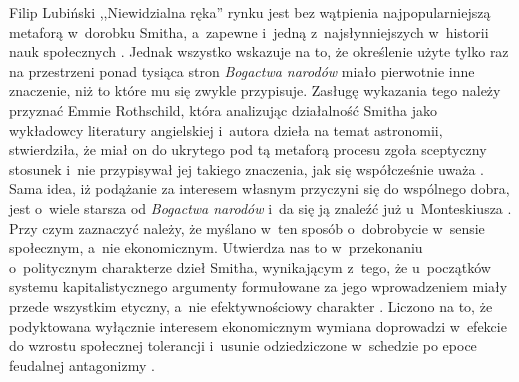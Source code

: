 \begin{artplenv}{Filip Lubiński}
,,Niewidzialna ręka'' rynku jest bez wątpienia najpopularniejszą metaforą w~dorobku
Smitha, a~zapewne i~jedną z~najsłynniejszych w~historii nauk społecznych
\parencite[s.~104]{cremaschi_metaphors_2002}.
Jednak wszystko
wskazuje na to, że określenie użyte tylko raz na przestrzeni ponad tysiąca stron \textit{Bogactwa narodów} miało
pierwotnie inne znaczenie, niż to które mu się zwykle przypisuje. Zasługę wykazania tego należy przyznać Emmie
Rothschild, która analizując działalność Smitha jako wykładowcy literatury angielskiej i~autora dzieła na temat
astronomii, stwierdziła, że miał on do ukrytego pod tą metaforą procesu zgoła sceptyczny stosunek i~nie przypisywał jej
takiego znaczenia, jak się współcześnie uważa
\parencite[s.~116–153]{rothschild_economic_2002}.
Sama idea, iż
podążanie za interesem własnym przyczyni się do wspólnego dobra, jest o~wiele starsza od \textit{Bogactwa narodów} i~da
się ją znaleźć już u~Monteskiusza
\parencite[s.~50]{montesquieu_o_2009}.
Przy czym zaznaczyć należy, że
myślano w~ten sposób o~dobrobycie w~sensie społecznym, a~nie ekonomicznym. Utwierdza nas to w~przekonaniu o~politycznym
charakterze dzieł Smitha, wynikającym z~tego, że u~początków systemu kapitalistycznego argumenty formułowane za jego
wprowadzeniem miały przede wszystkim etyczny, a~nie efektywnościowy charakter
\parencite[s.~37–45]{hirschman_namietnosci_1997}.
Liczono na to, że podyktowana wyłącznie interesem ekonomicznym wymiana doprowadzi w~efekcie do wzrostu
społecznej tolerancji i~usunie odziedziczone w~schedzie po epoce feudalnej antagonizmy
\parencite[s.~23–36]{muller_mind_2003}.


\end{artplenv}

